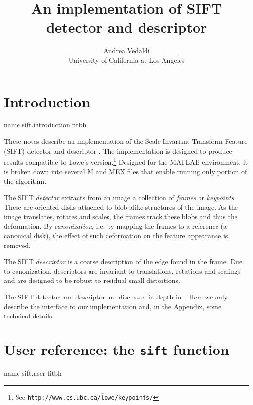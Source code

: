 \documentclass{article}
\title{An implementation of SIFT detector and descriptor}
\author{Andrea Vedaldi\\ University of California at Los Angeles}
\date{}
\let\oldtt=\tt
\renewcommand{\tt}{\oldtt\color{codecolor}}
\begin{document}
\maketitle{}

\let\oldlabel=\label
\renewcommand{\label}[1]{%
{\pdfdest name {#1} fitbh}%
\oldlabel{#1}%
}

\tableofcontents{}

\section{Introduction}\label{sift.introduction}

These notes describe an implementation of the Scale-Invariant Transform Feature (SIFT) detector and descriptor \cite{lowe04distinctive}. The implementation is designed to produce results compatible to Lowe's version.\footnote{See {\tt http://www.cs.ubc.ca/\~ lowe/keypoints/}} Designed for the MATLAB environment, it is broken down into several M and MEX files that enable running only portion of the algorithm.

The SIFT {\em detector} extracts from an image a collection of {\em frames} or {\em keypoints}. These are oriented disks attached to blob-alike structures of the image. As the image translates, rotates and scales, the frames track these blobs and thus the deformation. By {\em canonization}, i.e. by mapping the frames to a reference (a canonical disk), the effect of such deformation on the feature appearance is removed.

The SIFT {\em descriptor} is a coarse description of the edge found in the frame. Due to canonization, descriptors are invariant to translations, rotations and scalings and are designed to be robust to residual small distortions.

The SIFT detector and descriptor are discussed in depth in~\cite{lowe04distinctive}. Here we only describe the interface to our implementation and, in the Appendix, some technical details.

\section{User reference: the {\tt sift} function}\label{sift.user}
\end{document}
